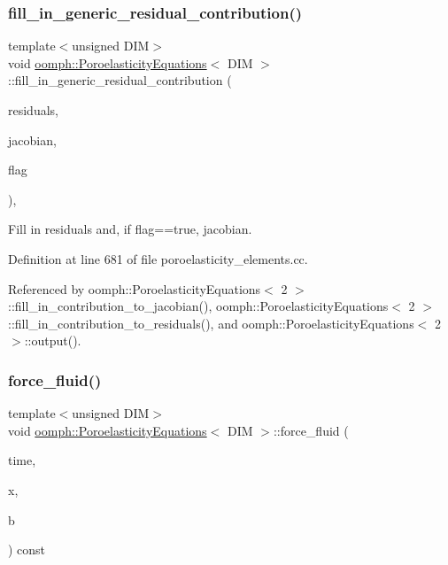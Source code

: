 \subsubsection{\texorpdfstring{fill\+\_\+in\+\_\+generic\+\_\+residual\+\_\+contribution()}{fill\_in\_generic\_residual\_contribution()}}
{\footnotesize\ttfamily template$<$unsigned D\+IM$>$ \\
void \hyperlink{classoomph_1_1PoroelasticityEquations}{oomph\+::\+Poroelasticity\+Equations}$<$ D\+IM $>$\+::fill\+\_\+in\+\_\+generic\+\_\+residual\+\_\+contribution (\begin{DoxyParamCaption}\item[{\hyperlink{classoomph_1_1Vector}{Vector}$<$ double $>$ \&}]{residuals,  }\item[{\hyperlink{classoomph_1_1DenseMatrix}{Dense\+Matrix}$<$ double $>$ \&}]{jacobian,  }\item[{bool}]{flag }\end{DoxyParamCaption})\hspace{0.3cm}{\ttfamily [protected]}, {\ttfamily [virtual]}}



Fill in residuals and, if flag==true, jacobian. 



Definition at line 681 of file poroelasticity\+\_\+elements.\+cc.



Referenced by oomph\+::\+Poroelasticity\+Equations$<$ 2 $>$\+::fill\+\_\+in\+\_\+contribution\+\_\+to\+\_\+jacobian(), oomph\+::\+Poroelasticity\+Equations$<$ 2 $>$\+::fill\+\_\+in\+\_\+contribution\+\_\+to\+\_\+residuals(), and oomph\+::\+Poroelasticity\+Equations$<$ 2 $>$\+::output().

\mbox{\label{classoomph_1_1PoroelasticityEquations_aae946ee5e9f6190e34cd1ca1b2c98971}} 
\subsubsection{\texorpdfstring{force\+\_\+fluid()}{force\_fluid()}}
{\footnotesize\ttfamily template$<$unsigned D\+IM$>$ \\
void \hyperlink{classoomph_1_1PoroelasticityEquations}{oomph\+::\+Poroelasticity\+Equations}$<$ D\+IM $>$\+::force\+\_\+fluid (\begin{DoxyParamCaption}\item[{const double \&}]{time,  }\item[{const \hyperlink{classoomph_1_1Vector}{Vector}$<$ double $>$ \&}]{x,  }\item[{\hyperlink{classoomph_1_1Vector}{Vector}$<$ double $>$ \&}]{b }\end{DoxyParamCaption}) const\hspace{0.3cm}{\ttfamily [inline]}}



